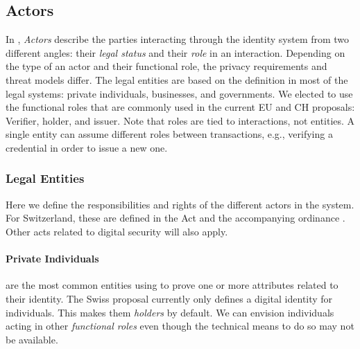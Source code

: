 \subsection{Actors}
\label{subsub:actors}

In \emph{\rot}, \emph{Actors} describe the parties interacting through the identity system from two different angles: their \emph{legal status} and their \emph{role} in an interaction.
Depending on the type of an actor and their functional role, the privacy requirements and threat models differ.
The legal entities are based on the definition in most of the legal systems: private individuals, businesses, and governments.
We elected to use the functional roles that are commonly used in the current EU and CH proposals: Verifier, holder, and issuer.
Note that roles are tied to interactions, not entities. 
A single entity can assume different roles between transactions, e.g., verifying a credential in order to issue a new one.


\vspace{1em}


\subsubsection{Legal Entities} 

Here we define the responsibilities and rights of the different actors in the system.
For Switzerland, these are defined in the \eid Act \cite{BGEID24} and the accompanying ordinance \cite{VEID25}.
Other acts related to digital security will also apply.

\paragraph{Private Individuals} are the most common entities using \eid to prove one or more attributes related to their identity.
The Swiss proposal currently only defines a digital identity for individuals.
This makes them \emph{holders} by default. We can envision individuals acting in other \emph{functional roles} even though the technical means to do so may not be available.

